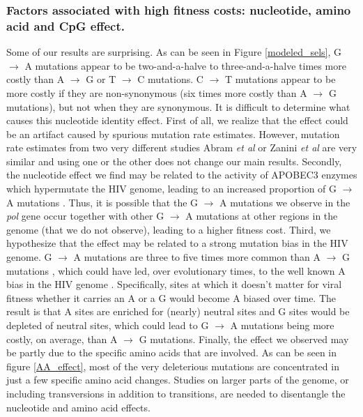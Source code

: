 \documentclass{article}
\begin{document}
\subsubsection*{Factors associated with high fitness costs: nucleotide, amino acid and CpG effect.}

Some of our results are surprising. 
As can be seen in Figure \ref{modeled_sels}, G $\rightarrow$ A mutations appear to be two-and-a-halve to three-and-a-halve times more costly than A $\rightarrow$ G or T $\rightarrow$ C mutations. C $\rightarrow$ T mutations appear to be more costly if they are non-synonymous (six times more costly than A $\rightarrow$ G mutations), but not when they are synonymous. 
It is difficult to determine what causes this nucleotide identity effect. 
First of all, we realize that the effect could be an artifact caused by spurious mutation rate estimates. However, mutation rate estimates from two very different studies Abram {\it et al} \cite{abram2010nature} or Zanini {\it et al} \cite{zanini2016vivo} are very similar and using one or the other does not change our main results. 
Secondly, the nucleotide effect we find may be related to the activity of APOBEC3 enzymes which hypermutate the HIV genome, leading to an increased proportion of G $\rightarrow$ A mutations \cite{sheehy2002isolation, chen2008structure, holden2008crystal}. Thus, it is possible that the G $\rightarrow$ A mutations we observe in the \textit{pol} gene occur together with other G $\rightarrow$ A mutations at other regions in the genome (that we do not observe), leading to a higher fitness cost. 
Third, we hypothesize that the effect may be related to a strong mutation bias in the HIV genome. G $\rightarrow$ A mutations are three to five times more common than A $\rightarrow$ G mutations \cite{abram2010nature, zanini2016vivo}, which could have led, over evolutionary times, to the well known A bias in the HIV genome \cite{van2013nucleotide, van2014nucleotide}. Specifically, sites at which it doesn't matter for viral fitness whether it carries an A or a G would become A biased over time. The result is that A sites are enriched for (nearly) neutral sites and G sites would be depleted of neutral sites, which could lead to G $\rightarrow$ A mutations being more costly, on average, than A $\rightarrow$ G mutations. 
Finally, the effect we observed may be partly due to the specific amino acids that are involved. As can be seen in figure \ref{AA_effect}, most of the very deleterious mutations are concentrated in just a few specific amino acid changes. Studies on larger parts of the genome, or including transversions in addition to transitions, are needed to disentangle the nucleotide and amino acid effects. 
\end{document}
